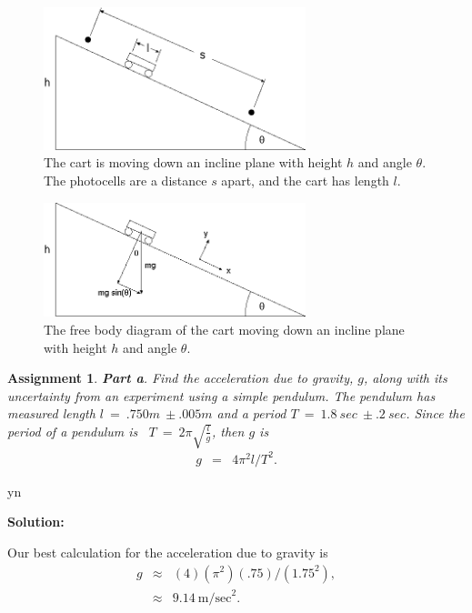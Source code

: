 \documentclass[12pt]{article}
\def\solutions{y}
\def\solutions{n}
\newtheorem{assignment}{Assignment}[section]
\begin{document}
\begin{figure}[tb]
  \centerline{\includegraphics[width=3in]{incline-1}}
  \caption{The cart is moving down an incline plane with height $h$
    and angle $\theta$. The photocells are a distance $s$ apart, and
    the cart has length $l$.}
  \label{fig:cartIncline}
\end{figure}

\begin{figure}[tb]
  \centerline{\includegraphics[width=3in]{incline-2}}
  \caption{The free body diagram of the cart moving down an incline
    plane with height $h$ and angle $\theta$. }
  \label{fig:cartInclineFBG}
\end{figure}


\begin{assignment}
  \textbf{Part a}.  Find the acceleration due to gravity, $g$, along
  with its uncertainty from an experiment using a simple pendulum.
  The pendulum has measured length $l~=~.750m~\pm{.005}m$ and a period
  $T~=~1.8~sec~\pm{.2}~sec$.  Since the period of a pendulum is
  ~$T~=~ 2\pi\sqrt{\frac{l}{g}}$, then $g$ is
  \begin{eqnarray}
    g & = & 4{\pi^2}l/T^2.
  \end{eqnarray}
\end{assignment}


\if y\solutions

\textbf{Solution:}

Our best calculation for the acceleration due to gravity is
\begin{eqnarray*}
  g & \approx & (4)({\pi^2})(.75)/({1.75^2}), \\
    & \approx & 9.14 ~ \mathrm{m/sec}^2.
\end{eqnarray*}
\end{document}
